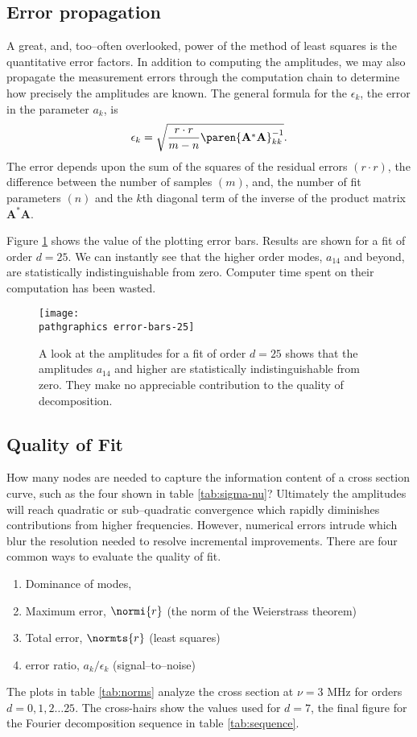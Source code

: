 \subsection{Error propagation}
A great, and, too--often overlooked, power of the method of least squares is the quantitative error factors. In addition to computing the amplitudes, we may also propagate the measurement errors through the computation chain to determine how precisely the amplitudes are known. The general formula for the $\epsilon_{k}$, the error in the parameter $a_{k}$, is
\begin{equation}
	\epsilon_{k} = \sqrt{\frac{r\cdot r}{m-n}\paren{\mathbf{A}^{*}\mathbf{A}}^{-1}_{kk}}.
\end{equation}
The error depends upon the sum of the squares of the residual errors $(r\cdot r)$, the difference between the number of samples $(m)$, and, the number of fit parameters $(n)$ and the $k$th diagonal term of the inverse of the product matrix $\mathbf{A}^{*}\mathbf{A}$.

Figure \ref{fig:error-bars-25} shows the value of the plotting error bars. Results are shown for a fit of order $d=25$. We can instantly see that the higher order modes, $a_{14}$ and beyond, are statistically indistinguishable from zero. Computer time spent on their computation has been wasted.

\begin{figure}[htbp]
	\begin{center}
		\texttt{[image: \\pathgraphics error-bars-25]}
	\end{center}
\caption{A look at the amplitudes for a fit of order $d=25$ shows that the amplitudes $a_{14}$ and higher are statistically indistinguishable from zero. They make no appreciable contribution to the quality of decomposition.}
\label{fig:error-bars-25}
\end{figure}

\subsection{Quality of Fit}
How many nodes are needed to capture the information content of a cross section curve, such as the four shown in table \ref{tab:sigma-nu}? Ultimately the amplitudes will reach quadratic or sub--quadratic convergence which rapidly diminishes contributions from higher frequencies. However, numerical errors intrude which blur the resolution needed to resolve incremental improvements. There are four common ways to evaluate the quality of fit.
\begin{enumerate}
	\item Dominance of modes,
	\item Maximum error, $\normi{r}$ (the norm of the Weierstrass theorem)
	\item Total error, $\normts{r}$ (least squares)
	\item error ratio, $a_{k}/\epsilon_{k}$ (signal--to--noise)
\end{enumerate}
The plots in table \ref{tab:norms} analyze the cross section at $\nu = 3$ MHz for orders $d=0,1,2 \dots 25$. The cross-hairs show the values used for $d=7$, the final figure for the Fourier decomposition sequence in table \ref{tab:sequence}.


